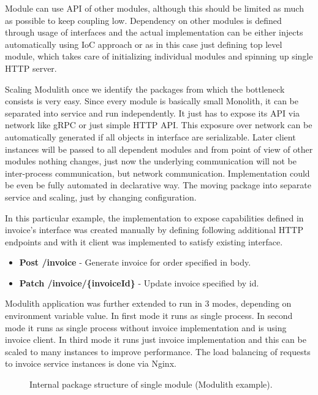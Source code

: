 Module can use API of other modules, although this should be limited as much as possible to keep coupling low. Dependency on other modules is defined through usage of interfaces and the actual implementation can be either injects automatically using IoC approach or as in this case just defining top level module, which takes care of initializing individual modules and spinning up single HTTP server.

Scaling Modulith once we identify the packages from which the bottleneck consists is very easy. Since every module is basically small Monolith, it can be separated into service and run independently. It just has to expose its API via network like gRPC or just simple HTTP API. This exposure over network can be automatically generated if all objects in interface are serializable. Later client instances will be passed to all dependent modules and from point of view of other modules nothing changes, just now the underlying communication will not be inter-process communication, but network communication. Implementation could be even be fully automated in declarative way. The moving package into separate service and scaling, just by changing configuration.

In this particular example, the implementation to expose capabilities defined in invoice's interface was created manually by defining following additional HTTP endpoints and with it client was implemented to satisfy existing interface.

\begin{itemize}
    \item \textbf{Post /invoice} - Generate invoice for order specified in body.
    \item \textbf{Patch /invoice/\{invoiceId\}} - Update invoice specified by id.
\end{itemize}

Modulith application was further extended to run in 3 modes, depending on environment variable value. In first mode it runs as single process. In second mode it runs as single process without invoice implementation and is using invoice client. In third mode it runs just invoice implementation and this can be scaled to many instances to improve performance. The load balancing of requests to invoice service instances is done via Nginx.

\begin{figure}
    \centering
    
    \caption{Internal package structure of single module (Modulith example). \label{img:modulith_module_package}}
\end{figure}

